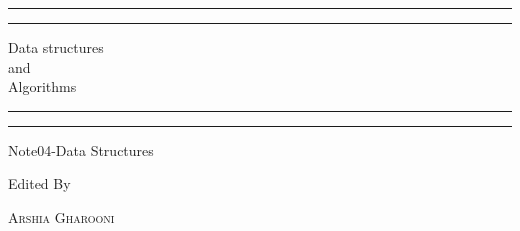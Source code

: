 \documentclass[a4paper, 11pt, oneside]{book} %
\begin{document}
 

\begin{titlepage} %

	\centering %
	
	\scshape %
	
	\vspace*{\baselineskip} %
	
	
	\rule{\textwidth}{1.6pt}\vspace*{-\baselineskip}\vspace*{2pt} %
	\rule{\textwidth}{0.4pt} %
	
	\vspace{0.75\baselineskip} %
	
	{\LARGE Data structures\\ and\\ Algorithms\\} %
	
	\vspace{0.75\baselineskip} %
	
	\rule{\textwidth}{0.4pt}\vspace*{-\baselineskip}\vspace{3.2pt} %
	\rule{\textwidth}{1.6pt} %
	
	\vspace{2\baselineskip} %
	
	
	Note04-Data Structures %
	
	\vspace*{3\baselineskip} %
	
	
	Edited By
	
	\vspace{0.5\baselineskip} %
	
	{\scshape\Large Arshia Gharooni \\} %
	

\end{titlepage}
\end{document}
